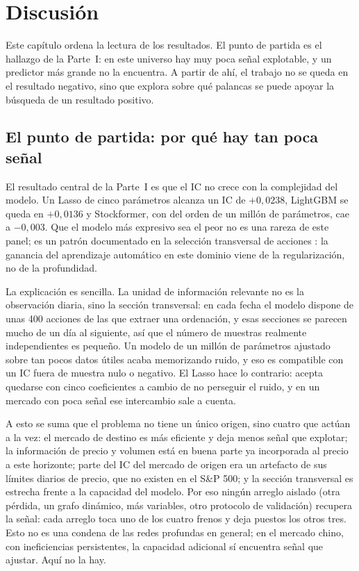 \chapter{Discusión}\label{cap:discusion}

Este capítulo ordena la lectura de los resultados. El punto de partida es el hallazgo de
la Parte~I: en este universo hay muy poca señal explotable, y un predictor más grande no
la encuentra. A partir de ahí, el trabajo no se queda en el resultado negativo, sino que
explora sobre qué palancas se puede apoyar la búsqueda de un resultado positivo.

\section{El punto de partida: por qué hay tan poca señal}\label{sec:d-simples}

El resultado central de la Parte~I es que el IC no crece con la complejidad del modelo. Un
Lasso de cinco parámetros alcanza un IC de $+0{,}0238$, LightGBM se queda en $+0{,}0136$ y
Stockformer, con del orden de un millón de parámetros, cae a $-0{,}003$. Que el modelo más
expresivo sea el peor no es una rareza de este panel; es un patrón documentado en la
selección transversal de acciones \autocite{gu2020empirical,rahimikia2025machine}: la
ganancia del aprendizaje automático en este dominio viene de la regularización, no de la
profundidad.

La explicación es sencilla. La unidad de información relevante no es la observación
diaria, sino la sección transversal: en cada fecha el modelo dispone de unas 400 acciones
de las que extraer una ordenación, y esas secciones se parecen mucho de un día al
siguiente, así que el número de muestras realmente independientes es pequeño. Un modelo de
un millón de parámetros ajustado sobre tan pocos datos útiles acaba memorizando ruido, y
eso es compatible con un IC fuera de muestra nulo o negativo. El Lasso hace lo contrario:
acepta quedarse con cinco coeficientes a cambio de no perseguir el ruido, y en un mercado
con poca señal ese intercambio sale a cuenta.

A esto se suma que el problema no tiene un único origen, sino cuatro que actúan a la vez:
el mercado de destino es más eficiente y deja menos señal que explotar; la información de
precio y volumen está en buena parte ya incorporada al precio a este horizonte; parte del
IC del mercado de origen era un artefacto de sus límites diarios de precio, que no existen
en el S\&P 500; y la sección transversal es estrecha frente a la capacidad del modelo. Por
eso ningún arreglo aislado (otra pérdida, un grafo dinámico, más variables, otro protocolo
de validación) recupera la señal: cada arreglo toca uno de los cuatro frenos y deja
puestos los otros tres. Esto no es una condena de las redes profundas en general; en el
mercado chino, con ineficiencias persistentes, la capacidad adicional sí encuentra señal
que ajustar. Aquí no la hay.


